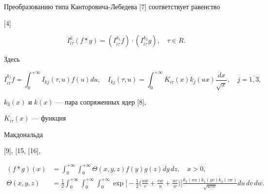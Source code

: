 \begin{exam}


Преобразованию типа Канторовича-Лебедева [7] соответствует равенство


[4]


\begin{equation}


I^k_{i\tau}(f\ast g)=(I^{k_1}_{i\tau}f)\cdot(I^{k_2}_{i\tau}g),


\quad \tau\in R.


\end{equation}


Здесь


$$


I^{k_j}_{i\tau}f=\int^{+\infty}_0 I_{kj}(\tau,u)f(u)du,\quad


I_{kj}(\tau,u)=\int^{+\infty}_0 K_{i\tau}(x)k_j(ux)


\frac{dx}{\sqrt x},\quad j=\overline{1,3},


$$


$k_3(x)$ и $k(x)$ --- пара сопряженных ядер [8],


$K_{i\tau}(x)$ --- функция


Макдональда


[9], [15, [16],


\begin{align*}


(f\ast g)(x)&=\int^{+\infty}_0 \int^{+\infty}_0 \Theta(x,y,z)


f(y)g(z)dy\,dz,\quad x>0,\\


\Theta(x,y,z)&=\frac{1}{2}\int^{+\infty}_0 \int^{+\infty}_0


\int^{+\infty}_0 \exp\biggl[-\frac{1}{2}\biggl(\frac{uw}{v}+


\frac{vw}{u}+\frac{uv}{w}\biggr)\biggr]


\frac{k_3(xu)k_1(yv)k_2(zw)}{\sqrt{uvw}}du\,dv\,dw.


\end{align*}


\end{exam}





